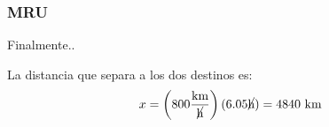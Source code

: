 \documentclass{beamer}
\begin{document}
\begin{frame}
\frametitle{MRU}
% 

\begin{center}
\end{center}


Finalmente..

 
La distancia que separa a los dos destinos es:
{\large
\begin{equation}
x=
\left(800\frac{\text{km}}{\cancel{\text{h}}}\right)
(6.05\cancel{\text{h}})=
4840~\text{km}
\end{equation}}

                                                             
\end{frame}

\end{document}
